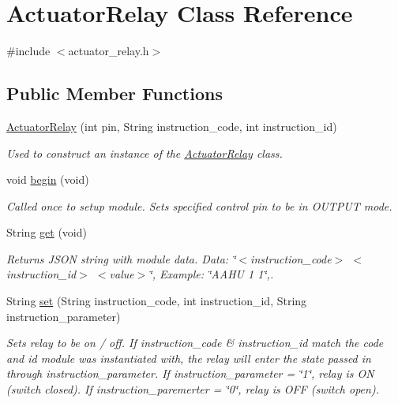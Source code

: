\hypertarget{class_actuator_relay}{}\section{Actuator\+Relay Class Reference}
\label{class_actuator_relay}


{\ttfamily \#include $<$actuator\+\_\+relay.\+h$>$}

\subsection*{Public Member Functions}
\begin{DoxyCompactItemize}
\item 
\hyperlink{class_actuator_relay_a0a19fabbd9a3ee500d906a55579ae4f3}{Actuator\+Relay} (int pin, String instruction\+\_\+code, int instruction\+\_\+id)
\begin{DoxyCompactList}\small\item\em Used to construct an instance of the \hyperlink{class_actuator_relay}{Actuator\+Relay} class. \end{DoxyCompactList}\item 
void \hyperlink{class_actuator_relay_abd921e88bb8fcecfbd5e1213e1faad56}{begin} (void)
\begin{DoxyCompactList}\small\item\em Called once to setup module. Sets specified control pin to be in O\+U\+T\+P\+U\+T mode. \end{DoxyCompactList}\item 
String \hyperlink{class_actuator_relay_affbcfa491c42a0aae3d69450cf7295b1}{get} (void)
\begin{DoxyCompactList}\small\item\em Returns J\+S\+O\+N string with module data. Data\+: \char`\"{}$<$instruction\+\_\+code$>$ $<$instruction\+\_\+id$>$ $<$value$>$\char`\"{}, Example\+: \char`\"{}\+A\+A\+H\+U 1 1\char`\"{},. \end{DoxyCompactList}\item 
String \hyperlink{class_actuator_relay_a29995263e5a05a3fdff0761cb4730306}{set} (String instruction\+\_\+code, int instruction\+\_\+id, String instruction\+\_\+parameter)
\begin{DoxyCompactList}\small\item\em Sets relay to be on / off. If instruction\+\_\+code \& instruction\+\_\+id match the code and id module was instantiated with, the relay will enter the state passed in through instruction\+\_\+parameter. If instruction\+\_\+parameter = \char`\"{}1\char`\"{}, relay is O\+N (switch closed). If instruction\+\_\+paremerter = \char`\"{}0\char`\"{}, relay is O\+F\+F (switch open). \end{DoxyCompactList}\end{DoxyCompactItemize}
